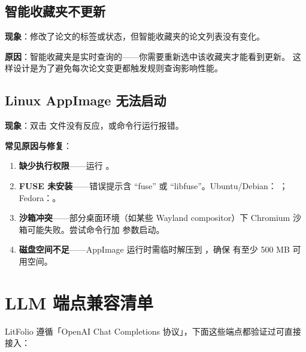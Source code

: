 \section{智能收藏夹不更新}

\textbf{现象}：修改了论文的标签或状态，但智能收藏夹的论文列表没有变化。

\textbf{原因}：智能收藏夹是实时查询的——你需要重新选中该收藏夹才能看到更新。
这样设计是为了避免每次论文变更都触发规则查询影响性能。

\section{Linux AppImage 无法启动}

\textbf{现象}：双击  文件没有反应，或命令行运行报错。

\textbf{常见原因与修复}：

\begin{enumerate}
  \item \textbf{缺少执行权限}——运行 。
  \item \textbf{FUSE 未安装}——错误提示含 ``fuse'' 或 ``libfuse''。Ubuntu/Debian：
    ；Fedora：。
  \item \textbf{沙箱冲突}——部分桌面环境（如某些 Wayland compositor）下 Chromium
    沙箱可能失败。尝试命令行加  参数启动。
  \item \textbf{磁盘空间不足}——AppImage 运行时需临时解压到 ，确保
    有至少 500 MB 可用空间。
\end{enumerate}

\appendix

\chapter{LLM 端点兼容清单}
\label{appx:llm}

LitFolio 遵循「OpenAI Chat Completions 协议」，下面这些端点都验证过可直接接入：

